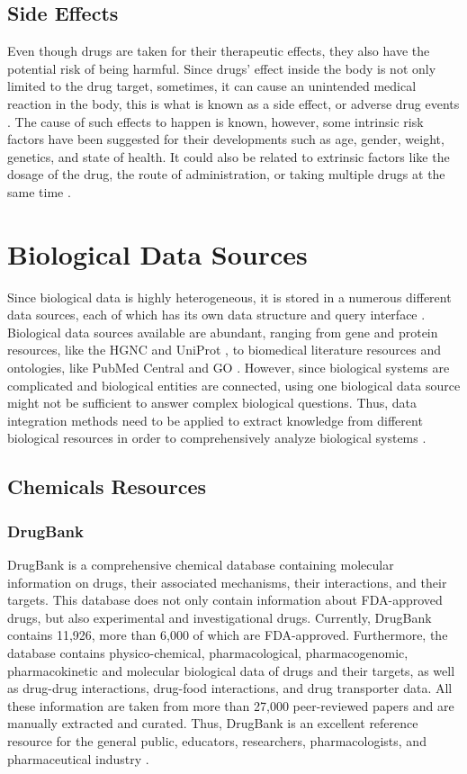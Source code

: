 \subsection{Side Effects}
Even though drugs are taken for their therapeutic effects, they also have the potential risk of being harmful. Since drugs’ effect inside the body is not only limited to the drug target, sometimes, it can cause an unintended medical reaction in the body, this is what is known as a side effect, or adverse drug events \cite{pourpak_understanding_2008}. The cause of such effects to happen is known, however, some intrinsic risk factors have been suggested for their developments such as age, gender, weight, genetics, and state of health. It could also be related to extrinsic factors like the dosage of the drug, the route of administration, or taking multiple drugs at the same time \cite{pourpak_understanding_2008}. 

\section{Biological Data Sources}
Since biological data is highly heterogeneous, it is stored in a numerous different data sources, each of which has its own data structure and query interface \cite{baralis_exploring_2008}. Biological data sources available are abundant, ranging from gene and protein resources, like the \ac{HGNC} \cite{baralis_exploring_2008} and UniProt \cite{noauthor_uniprot:_2019}, to biomedical literature resources and ontologies, like PubMed Central \cite{roberts_pubmed_2001} and \ac{GO} \cite{noauthor_gene_2008}. However, since biological systems are complicated and biological entities are connected, using one biological data source might not be sufficient to answer complex biological questions. Thus, data integration methods need to be applied to extract knowledge from different biological resources in order to comprehensively analyze biological systems \cite{baralis_exploring_2008}. 

\subsection{Chemicals Resources}
\subsubsection{DrugBank}
DrugBank is a comprehensive chemical database containing  molecular information on drugs, their associated mechanisms, their interactions, and their targets. This database does not only contain information about \ac{FDA}-approved drugs, but also experimental and investigational drugs. Currently, DrugBank contains 11,926, more than 6,000 of which are \ac{FDA}-approved. Furthermore, the database contains physico-chemical, pharmacological, pharmacogenomic, pharmacokinetic and molecular biological data of drugs and their targets, as well as drug-drug interactions, drug-food interactions, and drug transporter data. All these information are taken from more than 27,000 peer-reviewed papers and are manually extracted and curated. Thus, DrugBank is an excellent reference resource for the general public, educators, researchers, pharmacologists, and pharmaceutical industry \cite{wishart_drugbank_2018}.

